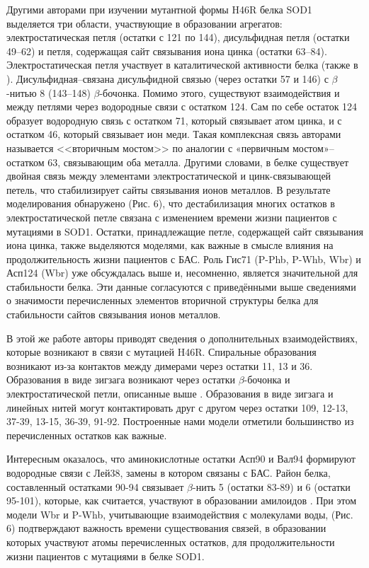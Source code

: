 Другими авторами \cite{Antonyuk2005} при изучении мутантной формы H46R белка SOD1 выделяется три области, участвующие в образовании агрегатов: электростатическая петля (остатки с 121 по 144), дисульфидная петля (остатки  49–62) и петля, содержащая сайт связывания иона цинка (остатки  63–84).  Электростатическая петля участвует в каталитической активности белка (также в \cite{Keerthana2015}). Дисульфидная--связана дисульфидной связью (через остатки 57 и 146) с $\beta$-нитью 8 (143–148) $\beta$-бочонка. Помимо этого, существуют взаимодействия и между петлями через водородные связи с остатком 124. Сам по себе остаток 124 образует водородную связь с остатком 71, который связывает атом цинка, и с остатком 46, который связывает ион меди. Такая комплексная связь авторами называется <<вторичным мостом>> по аналогии с «первичным мостом»--остатком 63, связывающим оба металла. Другими словами, в белке существует двойная связь между элементами электростатической и цинк-связывающей петель, что стабилизирует сайты связывания ионов металлов. В результате моделирования обнаружено (Рис. 6), что дестабилизация многих остатков в электростатической петле связана с изменением времени жизни пациентов с мутациями в SOD1. Остатки, принадлежащие петле, содержащей сайт связывания иона цинка, также выделяются моделями, как важные в смысле влияния на продолжительность жизни пациентов с БАС. Роль Гис71 (P-Phb, P-Whb, Wbr) и Асп124 (Wbr) уже обсуждалась выше и, несомненно, является значительной для стабильности белка. Эти данные согласуются с приведёнными выше сведениями о значимости перечисленных элементов вторичной структуры белка для стабильности сайтов связывания ионов металлов. 

В этой же работе \cite{Antonyuk2005} авторы приводят сведения о дополнительных взаимодействиях, которые возникают в связи с мутацией H46R. Спиральные образования возникают из-за контактов между димерами через остатки 11, 13 и 36. Образования в виде зигзага возникают через остатки $\beta$-бочонка и электростатической петли, описанные выше \cite{Elam2003}. Образования в виде зигзага и линейных нитей могут контактировать друг с другом через остатки 109, 12-13, 37-39, 13-15, 36-39, 91-92. Построенные нами модели отметили большинство из перечисленных остатков как важные.

Интересным оказалось, что  аминокислотные остатки Асп90 и Вал94 формируют водородные связи с Лей38, замены в котором связаны с БАС. Район белка, составленный остатками 90-94 связывает  $\beta$-нить 5 (остатки 83-89) и 6 (остатки 95-101), которые, как считается, участвуют в образовании амилоидов \cite{Banci2009}. При этом модели Wbr и P-Whb, учитывающие взаимодействия с молекулами воды, (Рис. 6) подтверждают важность времени существования связей, в образовании которых участвуют атомы перечисленных остатков, для продолжительности жизни пациентов с мутациями в белке SOD1.

